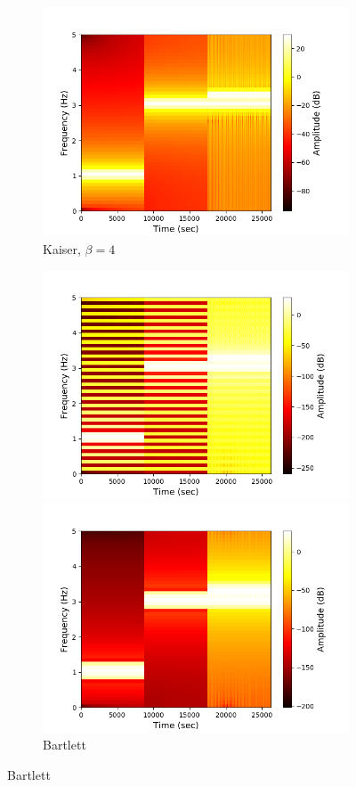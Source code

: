 \begin{figure}[H]
\begin{subfigure}{0.49\textwidth}
\includegraphics[width=\textwidth]{figures/stft_windows/100/kaiser_4.png}
\caption{Kaiser, $\beta=4$}
\label{fig:stft_kaiser_100_4}
\end{subfigure}
\begin{subfigure}{0.49\textwidth}
\centering
\includegraphics[width=\textwidth]{figures/stft_windows/100/bartlett.png}
\caption{Bartlett}
\label{fig:stft_bartlett_100}
\includegraphics[width=\textwidth]{figures/stft_windows/100/blackman.png}

\end{subfigure}
\end{figure}
